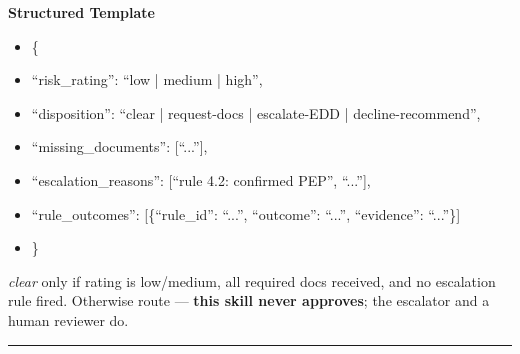 \documentclass[11pt]{article}
\begin{document}
\textbf{Structured Template}
\begin{itemize}[leftmargin=*,itemsep=2pt,topsep=2pt]
\item {} \{
\item {} ``risk\_\allowbreak{}rating'': ``low | medium | high'',
\item {} ``disposition'': ``clear | request-docs | escalate-EDD | decline-recommend'',
\item {} ``missing\_\allowbreak{}documents'': [``...''],
\item {} ``escalation\_\allowbreak{}reasons'': [``rule 4.2: confirmed PEP'', ``...''],
\item {} ``rule\_\allowbreak{}outcomes'': [\{``rule\_\allowbreak{}id'': ``...'', ``outcome'': ``...'', ``evidence'': ``...''\}]
\item {} \}
\end{itemize}

\emph{clear} only if rating is low/medium, all required docs received, and no escalation rule fired. Otherwise route — \textbf{this skill never approves}; the escalator and a human reviewer do.


\vspace{0.8em}\hrule\vspace{0.8em}
\end{document}
